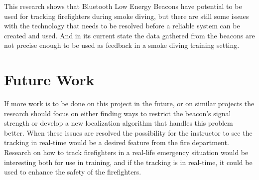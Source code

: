 \documentclass[../Main/thesis.tex]{subfiles}
\begin{document}
This research shows that Bluetooth Low Energy Beacons have potential to be used for tracking firefighters during smoke diving, but there are still some issues with the technology that needs to be resolved before a reliable system can be created and used.
And in its current state the data gathered from the beacons are not precise enough to be used as feedback in a smoke diving training setting.

\section{Future Work}
If more work is to be done on this project in the future, or on similar projects the research should focus on either finding ways to restrict the beacon's signal strength or develop a new localization algorithm that handles this problem better.
When these issues are resolved the possibility for the instructor to see the tracking in real-time would be a desired feature from the fire department.
Research on how to track firefighters in a real-life emergency situation would be interesting both for use in training, and if the tracking is in real-time, it could be used to enhance the safety of the firefighters.
\end{document}
